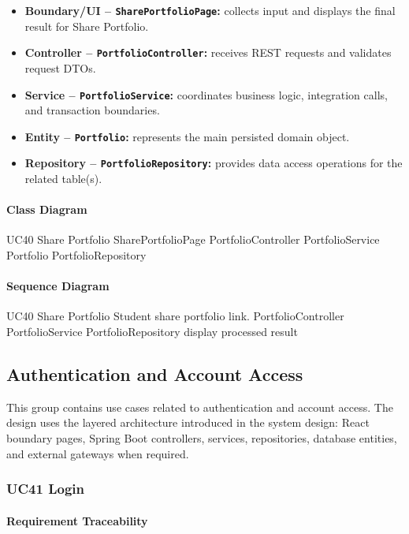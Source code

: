 \begin{itemize}
    \item \textbf{Boundary/UI -- \texttt{SharePortfolioPage}:} collects input and displays the final result for Share Portfolio.
    \item \textbf{Controller -- \texttt{PortfolioController}:} receives REST requests and validates request DTOs.
    \item \textbf{Service -- \texttt{PortfolioService}:} coordinates business logic, integration calls, and transaction boundaries.
    \item \textbf{Entity -- \texttt{Portfolio}:} represents the main persisted domain object.
    \item \textbf{Repository -- \texttt{PortfolioRepository}:} provides data access operations for the related table(s).
\end{itemize}

\paragraph{Class Diagram}

\ClassDiagram
{UC40 Share Portfolio}
{SharePortfolioPage}
{PortfolioController}
{PortfolioService}
{Portfolio}
{PortfolioRepository}

\paragraph{Sequence Diagram}

\SequenceDiagram
{UC40 Share Portfolio}
{Student}
{share portfolio link.}
{PortfolioController}
{PortfolioService}
{PortfolioRepository}
{display processed result}

\subsection{Authentication and Account Access}

This group contains use cases related to authentication and account access. The design uses the layered architecture introduced in the system design: React boundary pages, Spring Boot controllers, services, repositories, database entities, and external gateways when required.

\subsubsection{UC41 Login}

\paragraph{Requirement Traceability}

